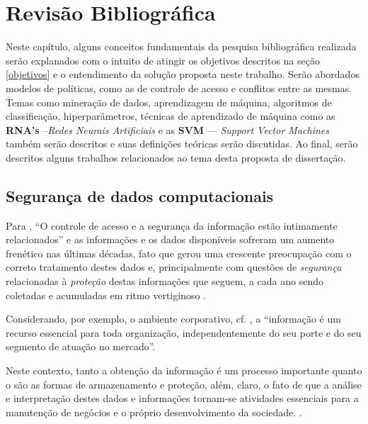 \chapter{Revisão Bibliográfica}\label{referencial_teorico}
Neste capítulo, alguns conceitos fundamentais da pesquisa bibliográfica realizada serão explanados com o intuito de atingir os objetivos descritos na seção \ref{objetivos} e o entendimento da solução proposta neste trabalho. Serão abordados modelos de políticas, como as de controle de acesso e conflitos entre as mesmas. Temas como mineração de dados, aprendizagem de máquina, algoritmos de classificação, hiperparâmetros, técnicas de aprendizado de máquina como  as \textbf{RNA's} --\textit{Redes Neurais Artificiais} e as \textbf{SVM} --- \textit{Support Vector Machines} também serão descritos e suas definições teóricas serão discutidas. Ao final, serão descritos alguns trabalhos relacionados ao tema desta proposta de dissertação.

\section{Segurança de dados computacionais} \label{seguranca_informacao}
Para , ``O controle de acesso e a segurança da informação estão intimamente relacionados'' e as informações e os dados disponíveis sofreram um aumento frenético nas últimas décadas, fato que gerou uma crescente preocupação com o correto tratamento destes dados e, principalmente com questões de \textit{segurança} relacionadas à \textit{proteção} destas informações que seguem, a cada ano sendo coletadas e acumuladas em ritmo vertiginoso \cite{alecrim2019, machado2014, lima_fraud_2012, fayyad1996, santos_segurancnos_2007}. 

Considerando, por exemplo, o ambiente corporativo, cf. , a ``informação é um recurso essencial para toda organização, independentemente do seu porte e do seu segmento de atuação no mercado''. 


Neste contexto, tanto a obtenção da informação é um processo importante quanto o são as formas de armazenamento e proteção, além, claro, o fato de que a análise e interpretação destes dados e informações tornam-se atividades essenciais para a manutenção de negócios e o próprio desenvolvimento da sociedade. \cite{Boscarioli2017} \cite{marciano_segurancda_nodate}.

